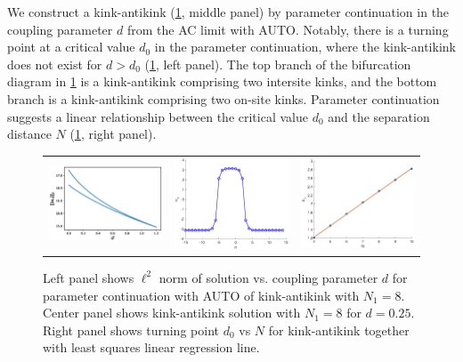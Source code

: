 \documentclass[12pt]{article}
\begin{document}
We construct a kink-antikink (\cref{fig:kak}, middle panel) by parameter continuation in the coupling parameter $d$ from the AC limit with AUTO. Notably, there is a turning point at a critical value $d_0$ in the parameter continuation, where the kink-antikink does not exist for $d > d_0$ (\cref{fig:kak}, left panel). The top branch of the bifurcation diagram in \cref{fig:kak} is a kink-antikink comprising two intersite kinks, and the bottom branch is a kink-antikink comprising two on-site kinks. Parameter continuation suggests a linear relationship between the critical value $d_0$ and the separation distance $N$ (\cref{fig:kak}, right panel).

\begin{figure}[H]
	\begin{center}
	\begin{tabular}{ccc}
	\includegraphics[width=5cm]{kak8.eps}	&
	\includegraphics[width=5cm]{2kink.eps} &
	\includegraphics[width=5cm]{kakd0vsN.eps}
	\end{tabular}
	\end{center}
	\caption{Left panel shows $\ell^2$ norm of solution vs. coupling parameter $d$ for parameter continuation with AUTO of kink-antikink with $N_1 = 8$. Center panel shows kink-antikink solution with $N_1 = 8$ for $d = 0.25$. Right panel shows turning point $d_0$ vs $N$ for kink-antikink together with least squares linear regression line.}
	\label{fig:kak}
\end{figure}
\end{document}
